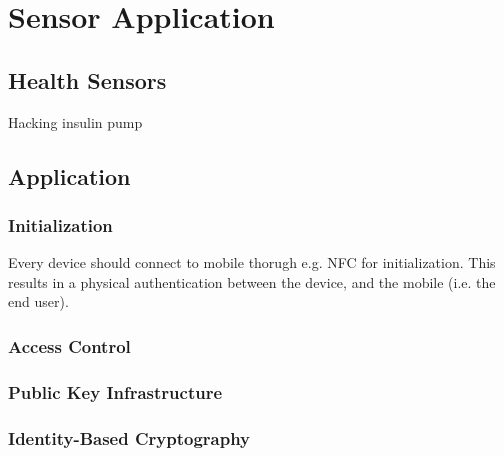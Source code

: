 \chapter{Sensor Application}

\section{Health Sensors}
Hacking insulin pump~\cite{radcliffe2011hacking}
\section{Application}

\subsection{Initialization}

Every device should connect to mobile thorugh e.g. \gls{NFC} for initialization.
This results in a physical authentication between the device, and the mobile (i.e. the end user).


\subsection{Access Control}

\subsection{Public Key Infrastructure}

\subsection{Identity-Based Cryptography}